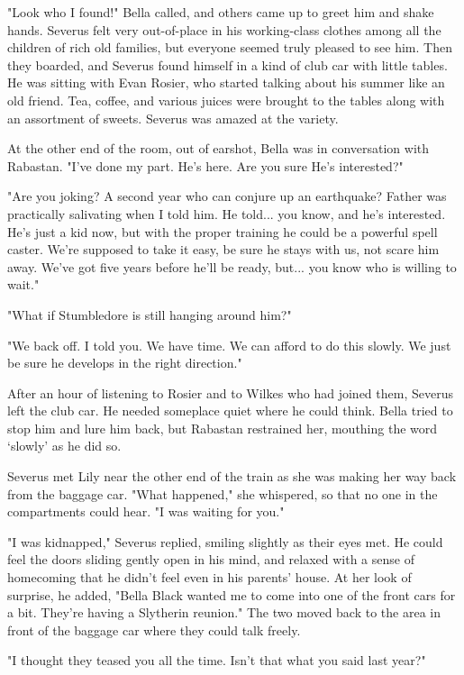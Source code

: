 "Look who I found!" Bella called, and others came up to greet him and shake hands. Severus felt very out-of-place in his working-class clothes among all the children of rich old families, but everyone seemed truly pleased to see him. Then they boarded, and Severus found himself in a kind of club car with little tables. He was sitting with Evan Rosier, who started talking about his summer like an old friend. Tea, coffee, and various juices were brought to the tables along with an assortment of sweets. Severus was amazed at the variety.

At the other end of the room, out of earshot, Bella was in conversation with Rabastan. "I've done my part. He's here. Are you sure He's interested?"

"Are you joking? A second year who can conjure up an earthquake? Father was practically salivating when I told him. He told... you know, and he's interested. He's just a kid now, but with the proper training he could be a powerful spell caster. We're supposed to take it easy, be sure he stays with us, not scare him away. We've got five years before he'll be ready, but... you know who is willing to wait."

"What if Stumbledore is still hanging around him?"

"We back off. I told you. We have time. We can afford to do this slowly. We just be sure he develops in the right direction."

After an hour of listening to Rosier and to Wilkes who had joined them, Severus left the club car. He needed someplace quiet where he could think. Bella tried to stop him and lure him back, but Rabastan restrained her, mouthing the word `slowly' as he did so.

Severus met Lily near the other end of the train as she was making her way back from the baggage car. "What happened," she whispered, so that no one in the compartments could hear. "I was waiting for you."

"I was kidnapped," Severus replied, smiling slightly as their eyes met. He could feel the doors sliding gently open in his mind, and relaxed with a sense of homecoming that he didn't feel even in his parents' house. At her look of surprise, he added, "Bella Black wanted me to come into one of the front cars for a bit. They're having a Slytherin reunion." The two moved back to the area in front of the baggage car where they could talk freely.

"I thought they teased you all the time. Isn't that what you said last year?"

